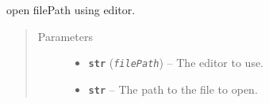 \documentclass[a4paper,10pt,english]{sphinxmanual}
\begin{document}
\begin{fulllineitems}
\label{commands/apidoc/src:src.system.show_in_editor}
open filePath using editor.
\begin{quote}\begin{description}
\item[{Parameters}] \leavevmode\begin{itemize}
\item {} 
\textbf{\texttt{str}} (\emph{\texttt{filePath}}) -- The editor to use.

\item {} 
\textbf{\texttt{str}} -- The path to the file to open.

\end{itemize}

\end{description}\end{quote}

\end{fulllineitems}

\end{document}
